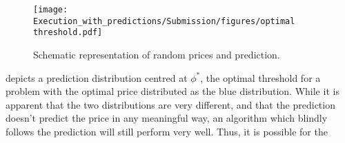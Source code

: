 \begin{figure}
    \centering
    \texttt{[image: Execution\_with\_predictions/Submission/figures/optimal threshold.pdf]}
    \caption{Schematic representation of random prices and prediction.}
    \label{fig:thresholds and predictions}
\end{figure}

 depicts a prediction distribution centred at $\phi^*$, the optimal threshold for a \OMS{} problem with the optimal price distributed as the blue distribution. While it is apparent that the two distributions are very different, and that the prediction doesn't predict the price in any meaningful way, an algorithm which blindly follows the prediction will still perform very well. Thus, it is possible for the 